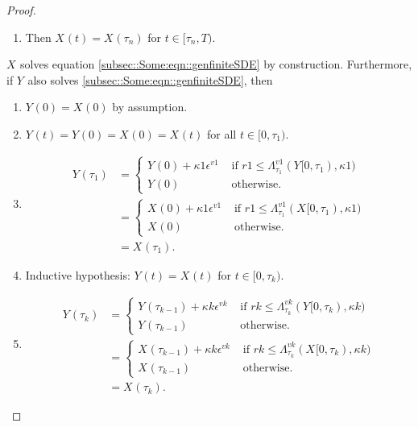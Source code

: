 \documentclass[12pt]{article}
\newcommand{\te}{\text}
\newcommand{\ep}{\epsilon}
\renewcommand{\v}{v}							%
\newcommand{\ev}{\ep}							%
\newcommand{\T}{T}								%
\renewcommand{\t}{t}							%
\newcommand{\X}{X}								%
\newcommand{\vind}[1]{^{#1}}					%
\newcommand{\cind}[1]{_{#1}}					%
\newcommand{\tp}[1]{(#1)}						%
\newcommand{\tip}[1]{#1}						%
\newcommand{\ts}[1]{_{#1}}						%
\renewcommand{\r}{r}							%
\newcommand{\indx}[1]{_{#1}}					%
\newcommand{\XX}{Y}								%
\newcommand{\rt}{\tau}							%
\renewcommand{\it}{k}							%
\renewcommand{\mark}{\kappa}					%
\newcommand{\ratee}{\Lambda}					%
\begin{document}
\begin{proof}
\begin{enumerate}
\item Then \(\X\cind{}\tp{\t} = \X\cind{}\tp{\rt\indx{n}}\) for \(\t\in [\rt\indx{n},\T)\).
\end{enumerate}

\(\X\cind{}\tip{}\) solves equation \eqref{subsec::Some:eqn::genfiniteSDE} by construction. Furthermore, if \(\XX\cind{}\tip{}\) also solves \eqref{subsec::Some:eqn::genfiniteSDE}, then 

\begin{enumerate}
\item \(\XX\cind{}\tp{0} = \X\cind{}\tp{0}\) by assumption.

\item \(\XX\cind{}\tp{\t} = \XX\cind{}\tp{0} = \X\cind{}\tp{0} = \X\cind{}\tp{\t}\) for all \(\t\in [0,\rt\indx{1})\).

\item 

\begin{align*}
\XX\cind{}\tp{\rt\indx{1}} &= \begin{cases}
\XX\cind{}\tp{0} + \mark{1}\ev\vind{\v{1}} &\te{ if } \r{1} \leq \ratee\ts{\rt\indx{1}}\vind{\v{1}}(\XX\cind{}\tip{[0,\rt\indx{1})},\mark{1})\\
\XX\cind{}\tp{0} &\te{ otherwise.}
\end{cases}\\
&= \begin{cases}
\X\cind{}\tp{0} + \mark{1}\ev\vind{\v{1}} &\te{ if } \r{1} \leq \ratee\ts{\rt\indx{1}}\vind{\v{1}}(\X\cind{}\tip{[0,\rt\indx{1})},\mark{1})\\
\X\cind{}\tp{0} &\te{ otherwise.}
\end{cases}\\
&= \X\cind{}\tp{\rt\indx{1}}.
\end{align*}

\item Inductive hypothesis: \(\XX\cind{}\tp{\t} = \X\cind{}\tp{\t}\) for \(\t\in [0,\rt\indx{\it})\). 

\item 

\begin{align*}
\XX\cind{}\tp{\rt\indx{\it}} &= \begin{cases}
\XX\cind{}\tp{\rt\indx{\it-1}} + \mark{\it}\ev\vind{\v{\it}} &\te{ if } \r{\it} \leq \ratee\ts{\rt\indx{\it}}\vind{\v{\it}}(\XX\cind{}\tip{[0,\rt\indx{\it})},\mark{\it})\\
\XX\cind{}\tp{\rt\indx{\it-1}} &\te{ otherwise.}
\end{cases}\\
&= \begin{cases}
\X\cind{}\tp{\rt\indx{\it-1}} + \mark{\it}\ev\vind{\v{\it}} &\te{ if } \r{\it} \leq \ratee\ts{\rt\indx{\it}}\vind{\v{\it}}(\X\cind{}\tip{[0,\rt\indx{\it})},\mark{\it})\\
\X\cind{}\tp{\rt\indx{\it-1}} &\te{ otherwise.}
\end{cases}\\
&= \X\cind{}\tp{\rt\indx{\it}}.
\end{align*}


\end{enumerate}
\end{proof}
\end{document}

